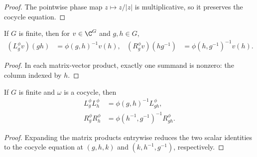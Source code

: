 \begin{proof}\leanok
    The pointwise phase map $z\mapsto z/|z|$ is multiplicative, so it preserves
    the cocycle equation.
\end{proof}

\begin{lemma}
    \label{thm:mpug_twisted_regular_action}
    \leanok
    If $G$ is finite, then for $v\in\C^G$ and $g,h\in G$,
    \begin{align}
        (L_g^\phi v)(gh)
         & =\phi(g,h)^{-1}v(h),
         &
        (R_g^\phi v)(hg^{-1})
         & =\phi(h,g^{-1})^{-1}v(h).
    \end{align}
\end{lemma}

\begin{proof}\leanok
    In each matrix-vector product, exactly one summand is nonzero: the column
    indexed by $h$.
\end{proof}

\begin{lemma}
    \label{thm:mpug_twisted_regular_multiplication}
    \leanok
    If $G$ is finite and $\omega$ is a cocycle, then
    \begin{align}
        L_g^\phi L_h^\phi
         & =\phi(g,h)^{-1}L_{gh}^\phi,           \\
        R_g^\phi R_h^\phi
         & =\phi(h^{-1},g^{-1})^{-1}R_{gh}^\phi.
        \label{eq:mpug_twisted_regular_multiplication}
    \end{align}
\end{lemma}

\begin{proof}\leanok
    Expanding the matrix products entrywise reduces the two scalar identities
    to the cocycle equation at $(g,h,k)$ and $(k,h^{-1},g^{-1})$, respectively.
\end{proof}

